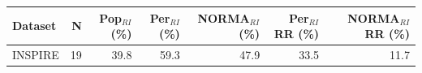 \begin{table}[ht]
\centering
\footnotesize
\begin{tabular}{lrrrrrr}
\toprule
Dataset & N & Pop$_{RI}$ (\%) & Per$_{RI}$ (\%) & NORMA$_{RI}$ (\%) & Per$_{RI}$ RR (\%) & NORMA$_{RI}$ RR (\%) \\
\midrule
INSPIRE & 19 & 39.8 & 59.3 & 47.9 & 33.5 & 11.7 \\
\bottomrule
\end{tabular}
\label{tab:07_prevalence}
\end{table}